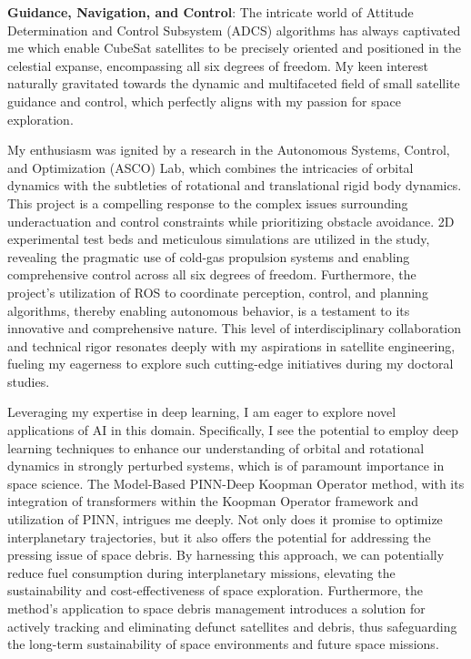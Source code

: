 \documentclass[a4,20pt]{article}
\begin{document}
\begin{large}
\textbf{Guidance, Navigation, and Control}: The intricate world of Attitude Determination and Control Subsystem (ADCS) algorithms has always captivated me which enable CubeSat satellites to be precisely oriented and positioned in the celestial expanse, encompassing all six degrees of freedom. My keen interest naturally gravitated towards the dynamic and multifaceted field of small satellite guidance and control, which perfectly aligns with my passion for space exploration. \vspace{-0.35cm}

My enthusiasm was ignited by a research in the Autonomous Systems, Control, and Optimization (ASCO) Lab, which combines the intricacies of orbital dynamics with the subtleties of rotational and translational rigid body dynamics. This project is a compelling response to the complex issues surrounding underactuation and control constraints while prioritizing obstacle avoidance. 2D experimental test beds and meticulous simulations are utilized in the study, revealing the pragmatic use of cold-gas propulsion systems and enabling comprehensive control across all six degrees of freedom. Furthermore, the project's utilization of ROS to coordinate perception, control, and planning algorithms, thereby enabling autonomous behavior, is a testament to its innovative and comprehensive nature. This level of interdisciplinary collaboration and technical rigor resonates deeply with my aspirations in satellite engineering, fueling my eagerness to explore such cutting-edge initiatives during my doctoral studies. \vspace{-0.35cm}


Leveraging my expertise in deep learning, I am eager to explore novel applications of AI in this domain. Specifically, I see the potential to employ deep learning techniques to enhance our understanding of orbital and rotational dynamics in strongly perturbed systems, which is of paramount importance in space science. The Model-Based PINN-Deep Koopman Operator method, with its integration of transformers within the Koopman Operator framework and utilization of PINN, intrigues me deeply. Not only does it promise to optimize interplanetary trajectories, but it also offers the potential for addressing the pressing issue of space debris. By harnessing this approach, we can potentially reduce fuel consumption during interplanetary missions, elevating the sustainability and cost-effectiveness of space exploration. Furthermore, the method's application to space debris management introduces a solution for actively tracking and eliminating defunct satellites and debris, thus safeguarding the long-term sustainability of space environments and future space missions. 


\end{large}
\end{document}
